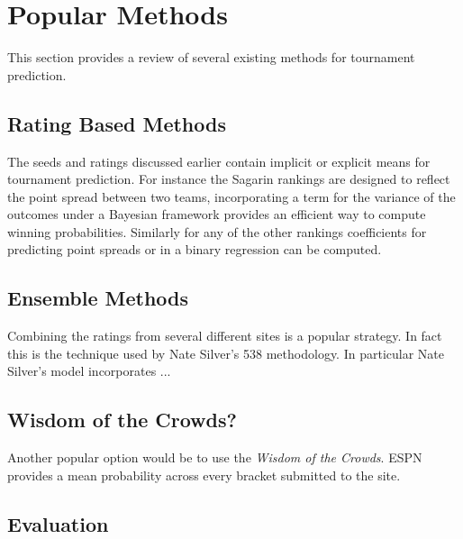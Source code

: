 \section{Popular Methods}  This section provides a review of several existing methods for tournament prediction.
\subsection{Rating Based Methods} 
The seeds and ratings discussed earlier contain implicit or explicit means for tournament prediction.  For instance the Sagarin rankings are designed to reflect the point spread between two teams, incorporating a term for the variance of the outcomes under a Bayesian framework provides an efficient way to compute winning probabilities.  Similarly for any of the other rankings coefficients for predicting point spreads or in a binary regression can be computed.
\subsection{Ensemble Methods}
Combining the ratings from several different sites is a popular strategy.  In fact this is the technique used by Nate Silver's 538 methodology.  In particular Nate Silver's model incorporates ... 
\subsection{Wisdom of the Crowds?}
Another popular option would be to use the \emph{Wisdom of the Crowds}.  ESPN provides a mean probability across every bracket submitted to the site.

\subsection{Evaluation}

